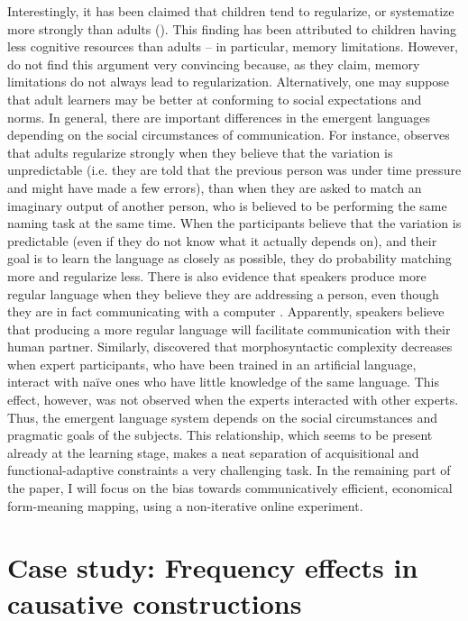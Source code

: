 \documentclass[output=paper]{langsci/langscibook}
\begin{document}
Interestingly, it has been claimed that children tend to regularize, or systematize more strongly than adults (\citealt{HudsonKamNewport2009}). This finding has been attributed to children having less cognitive resources than adults – in particular, memory limitations. However, \citet{SmithEtAl2017} do not find this argument very convincing because, as they claim, memory limitations do not always lead to regularization. Alternatively, one may suppose that adult learners may be better at conforming to social expectations and norms. In general, there are important differences in the emergent languages depending on the social circumstances of communication. For instance, \citet{Perfors2016} observes that adults regularize strongly when they believe that the variation is unpredictable (i.e. they are told that the previous person was under time pressure and might have made a few errors), than when they are asked to match an imaginary output of another person, who is believed to be performing the same naming task at the same time. When the participants believe that the variation is predictable (even if they do not know what it actually depends on), and their goal is to learn the language as closely as possible, they do probability matching more and regularize less. There is also evidence that speakers produce more regular language when they believe they are addressing a person, even though they are in fact communicating with a computer \citep{FehérEtAl2016}. Apparently, speakers believe that producing a more regular language will facilitate communication with their human partner. Similarly, \citet{Little2011} discovered that morphosyntactic complexity decreases when expert participants, who have been trained in an artificial language, interact with naïve ones who have little knowledge of the same language. This effect, however, was not observed when the experts interacted with other experts. Thus, the emergent language system depends on the social circumstances and pragmatic goals of the subjects. This relationship, which seems to be present already at the learning stage, makes a neat separation of acquisitional and functional-adaptive constraints a very challenging task.  
\newpage
In the remaining part of the paper, I will focus on the bias towards communicatively efficient, economical form-meaning mapping, using a non-iterative online experiment.

\section{Case study: Frequency effects in causative constructions}\label{sec:levshina:3}
\end{document}

